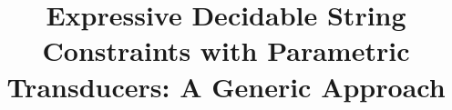 \documentclass{llncs}
\newcommand\shortlong[2]{#2}
\newcommand{\zhilin}[1]{\color{brown} {ZL: #1 :LZ} \color{black}}
\newcommand{\zhilin}[1]{}
\begin{document}
\title{Expressive Decidable String Constraints with Parametric Transducers: A Generic Approach}

\author{}
\institute{}

\maketitle


\vspace*{-3.1em}



\vspace*{-8mm}



\vspace*{-3mm}



\vspace*{-3mm}



\vspace*{-3mm}



\vspace*{-3mm}



\vspace*{-3mm}



\vspace*{-4mm}



%

\newpage




\shortlong{}{
    \newpage

    \appendix
    
    
    
    
    
}
\end{document}
